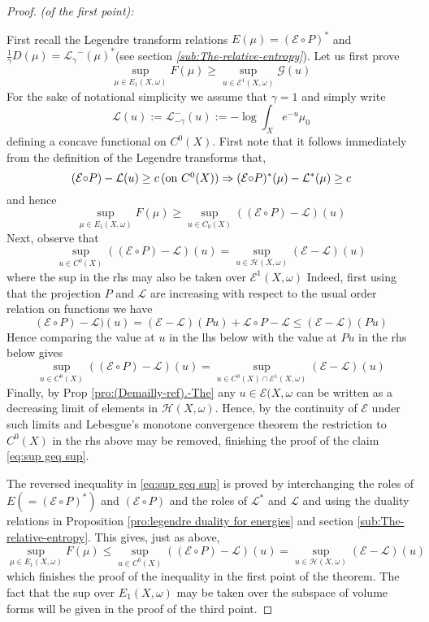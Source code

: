 \documentclass[11pt,oneside,english]{amsart}
\numberwithin{equation}{section}
\numberwithin{figure}{section}
\theoremstyle{plain}
\theoremstyle{plain}
\theoremstyle{plain}
\theoremstyle{plain}
\theoremstyle{remark}
\theoremstyle{definition}
\begin{document}
\begin{proof}
\emph{(of the first point):}

First recall the Legendre transform relations $E(\mu)=(\mathcal{E\circ}P)^{*}$
and $\frac{1}{\gamma}D(\mu)=\mathcal{L_{\gamma}}^{-}(\mu)^{*}$(see
section \emph{\ref{sub:The-relative-entropy}}). Let us first prove
\begin{equation}
\sup_{\mu\in E_{1}(X,\omega)}F(\mu)\geq\sup_{u\in\mathcal{E}^{1}(X,\omega)}\mathcal{G}(u)\label{eq:sup geq sup}
\end{equation}
 For the sake of notational simplicity we assume that $\gamma=1$
and simply write 
\[
\mathcal{L}(u):=\mathcal{L}_{-\gamma}^{-}(u):=-\log\int_{X}e^{-u}\mu_{0}
\]
 defining a concave functional on $C^{0}(X).$ First note that it
follows immediately from the definition of the Legendre transforms
that, 
\[
(\mathcal{E\circ}P)-\mathcal{L}(u)\geq c\,(\mbox{on \ensuremath{C^{0}(X))}}\Rightarrow(\mathcal{E\circ}P)^{*}(\mu)-\mathcal{L}^{*}(\mu)\geq c
\]
 and hence 
\[
\sup_{\mu\in E_{1}(X,\omega)}F(\mu)\geq\sup_{u\in C_{0}(X)}((\mathcal{E\circ}P)-\mathcal{L})(u)
\]
 Next, observe that 
\[
\sup_{u\in C^{0}(X)}((\mathcal{E\circ}P)-\mathcal{L})(u)=\sup_{u\in\mathcal{H}(X,\omega)}(\mathcal{E}-\mathcal{L})(u)
\]
 where the sup in the rhs may also be taken over $\mathcal{E}^{1}(X,\omega)$
Indeed, first using that the projection $P$ and $\mathcal{L}$ are
increasing with respect to the usual order relation on functions we
have 
\[
(\mathcal{E\circ}P)-\mathcal{L})(u)=(\mathcal{E}-\mathcal{L})(Pu)+\mathcal{L\circ}P-\mathcal{L\le}(\mathcal{E}-\mathcal{L})(Pu)
\]
 Hence comparing the value at $u$ in the lhs below with the value
at $Pu$ in the rhs below gives 
\[
\sup_{u\in C^{0}(X)}((\mathcal{E\circ}P)-\mathcal{L})(u)=\sup_{u\in C^{0}(X)\cap\mathcal{E}^{1}(X,\omega)}(\mathcal{E}-\mathcal{L})(u)
\]
 Finally, by Prop \ref{pro:(Demailly-ref).-The} any $u\in\mathcal{E}(X,\omega$
can be written as a decreasing limit of elements in $\mathcal{H}(X,\omega).$
Hence, by the continuity of $\mathcal{E}$ under such limits and Lebesgue's
monotone convergence theorem the restriction to $C^{0}(X)$ in the
rhs above may be removed, finishing the proof of the claim \ref{eq:sup geq sup}.

The reversed inequality in \ref{eq:sup geq sup} is proved by interchanging
the roles of $E(=(\mathcal{E\circ}P)^{*})$ and $(\mathcal{E\circ}P)$
and the roles of $\mathcal{L}^{*}$ and $\mathcal{L}$ and using the
duality relations in Proposition \ref{pro:legendre duality for energies}
and section \ref{sub:The-relative-entropy}. This gives, just as above,
\[
\sup_{\mu\in E_{1}(X,\omega)}F(\mu)\leq\sup_{u\in C^{0}(X)}((\mathcal{E\circ}P)-\mathcal{L})(u)=\sup_{u\in\mathcal{H}(X,\omega)}(\mathcal{E}-\mathcal{L})(u)
\]
 which finishes the proof of the inequality in the first point of
the theorem. The fact that the sup over $E_{1}(X,\omega)$ may be
taken over the subspace of volume forms will be given in the proof
of the third point.


\end{proof}
\end{document}
